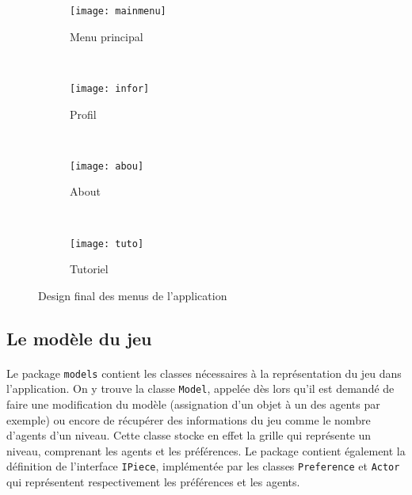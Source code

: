 \documentclass[../main.tex]{subfiles}
\begin{document}
\begin{figure}[ht!]
    \centering
    \begin{subfigure}{0.34\textwidth}
        \centering
        \texttt{[image: mainmenu]}
        \caption{Menu principal}
    \end{subfigure}
    ~
    \begin{subfigure}{0.34\textwidth}
        \centering
        \texttt{[image: infor]}
        \caption{Profil}
    \end{subfigure}
    ~
    \begin{subfigure}{0.34\textwidth}
        \centering
        \texttt{[image: abou]}
        \caption{About}
    \end{subfigure}
    ~
    \begin{subfigure}{0.34\textwidth}
        \centering
        \texttt{[image: tuto]}
        \caption{Tutoriel}
    \end{subfigure}
    \caption{Design final des menus de l'application}
    \label{fig-screen1}
\end{figure}
 
	\subsection{Le modèle du jeu}

\paragraph{}
Le package \texttt{models} contient les classes nécessaires à la représentation du jeu dans l'application. On y trouve la classe \texttt{Model}, appelée dès lors qu'il est demandé de faire une modification du modèle (assignation d'un objet à un des agents par exemple) ou encore de récupérer des informations du jeu comme le nombre d'agents d'un niveau. Cette classe stocke en effet la grille qui représente un niveau, comprenant les agents et les préférences. Le package contient également la définition de l'interface \texttt{IPiece}, implémentée par les classes \texttt{Preference} et \texttt{Actor} qui représentent respectivement les préférences et les agents.
\end{document}
